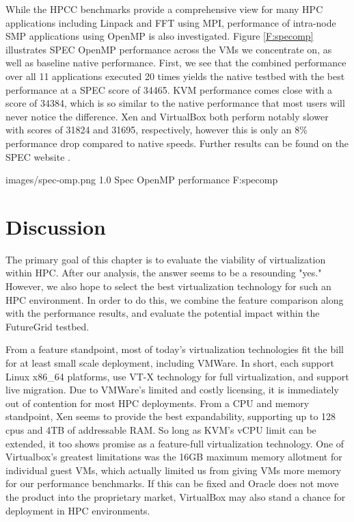 While the HPCC benchmarks provide a comprehensive view for many HPC applications including Linpack and FFT using MPI, performance of intra-node SMP applications using OpenMP is also investigated.  Figure \ref{F:specomp} illustrates SPEC OpenMP performance across the VMs we concentrate on, as well as baseline native performance.  First, we see that the combined performance over all 11 applications executed 20 times yields the native testbed with the best performance at a SPEC score of 34465.  KVM performance comes close with a score of 34384, which is so similar to the native performance that most users will never notice the difference.  Xen and VirtualBox both perform notably slower with scores of 31824 and 31695, respectively, however this is only an 8\% performance drop compared to native speeds. Further results can be found on the SPEC website \cite{spec2011}. 

  {images/spec-omp.png}
  {1.0}
  {Spec OpenMP performance}
  {F:specomp}

\section{Discussion}

The primary goal of this chapter is to evaluate the viability of virtualization within HPC.  After our analysis, the answer seems to be a resounding "yes."  However, we also hope to select the best virtualization technology for such an HPC environment.  In order to do this, we combine the feature comparison along with the performance results, and evaluate the potential impact within the FutureGrid testbed.    

From a feature standpoint, most of today's virtualization technologies fit the bill for at least small scale deployment, including VMWare.  In short, each support Linux x86\_64 platforms, use VT-X technology for full virtualization, and support live migration.  Due to VMWare's limited and costly licensing, it is immediately out of contention for most HPC deployments.  From a CPU and memory standpoint, Xen seems to provide the best expandability, supporting up to 128 cpus and 4TB of addressable RAM.  So long as KVM's vCPU limit can be extended, it too shows promise as a feature-full virtualization technology.  One of Virtualbox's greatest limitations was the 16GB maximum memory allotment for individual guest VMs, which actually limited us from giving VMs more memory for our performance benchmarks. If this can be fixed and Oracle does not move the product into the proprietary market, VirtualBox may also stand a chance for deployment in HPC environments.  


